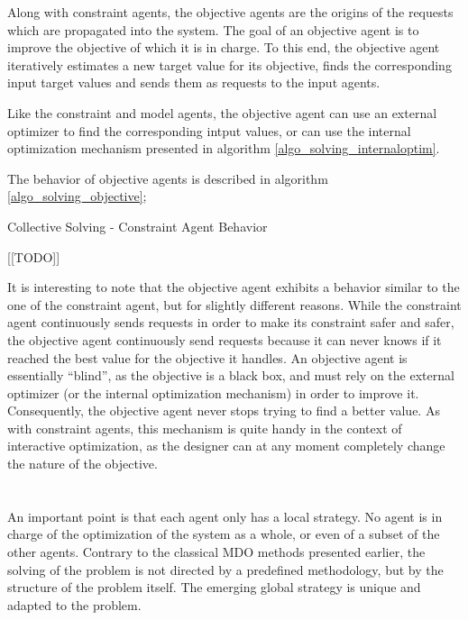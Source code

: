 Along with constraint agents, the objective agents are the origins of the requests which are propagated into the system. The goal of an objective agent is to improve the objective of which it is in charge. To this end, the objective agent iteratively estimates a new target value for its objective, finds the corresponding input target values and sends them as requests to the input agents.

Like the constraint and model agents, the objective agent can use an external optimizer to find the corresponding intput values, or can use the internal optimization mechanism presented in algorithm \ref{algo_solving_internaloptim}.

The behavior of objective agents is described in algorithm \ref{algo_solving_objective};

\begin{algorithm}
\caption{Collective Solving - Constraint Agent Behavior}
\label{algo_solving_objective}

	[[TODO]]\;
	
\end{algorithm}

It is interesting to note that the objective agent exhibits a behavior similar to the one of the constraint agent, but for slightly different reasons. While the constraint agent continuously sends requests in order to make its constraint safer and safer, the objective agent continuously send requests because it can never knows if it reached the best value for the objective it handles. An objective agent is essentially \enquote{blind}, as the objective is a black box, and must rely on the external optimizer (or the internal optimization mechanism) in order to improve it. Consequently, the objective agent never stops trying to find a better value. As with constraint agents, this mechanism is quite handy in the context of interactive optimization, as the designer can at any moment completely change the nature of the objective.

\section*{}
An important point is that each agent only has a local strategy. No agent is in charge of the optimization of the system as a whole, or even of a subset of the other agents. Contrary to the classical MDO methods presented earlier, the solving of the problem is not directed by a predefined methodology, but by the structure of the problem itself. The emerging global strategy is unique and adapted to the problem.

